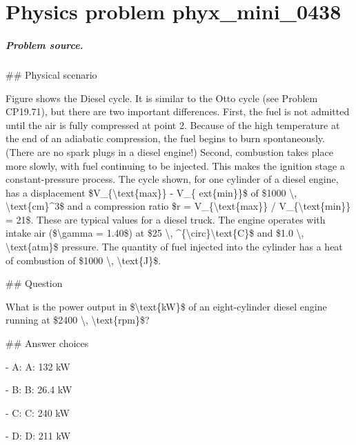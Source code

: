 
\chapter{Physics problem phyx\_mini\_0438}
\label{ch:PhyXMiniProblems_problem_phyx_mini_0438}

\paragraph{Problem source.}
\#\# Physical scenario

Figure shows the Diesel cycle. It is similar to the Otto cycle (see Problem CP19.71), but there are two important differences. First, the fuel is not admitted until the air is fully compressed at point 2. Because of the high temperature at the end of an adiabatic compression, the fuel begins to burn spontaneously. (There are no spark plugs in a diesel engine!) Second, combustion takes place more slowly, with fuel continuing to be injected. This makes the ignition stage a constant-pressure process. The cycle shown, for one cylinder of a diesel engine, has a displacement \$V\_\{\textbackslash{}text\{max\}\} - V\_\{	ext\{min\}\}\$ of \$1000 \textbackslash{}, \textbackslash{}text\{cm\}\textasciicircum{}3\$ and a compression ratio \$r = V\_\{\textbackslash{}text\{max\}\} / V\_\{\textbackslash{}text\{min\}\} = 21\$. These are typical values for a diesel truck. The engine operates with intake air (\$\textbackslash{}gamma = 1.40\$) at \$25 \textbackslash{}, \textasciicircum{}\{\textbackslash{}circ\}\textbackslash{}text\{C\}\$ and \$1.0 \textbackslash{}, \textbackslash{}text\{atm\}\$ pressure. The quantity of fuel injected into the cylinder has a heat of combustion of \$1000 \textbackslash{}, \textbackslash{}text\{J\}\$.

\#\# Question

What is the power output in \$\textbackslash{}text\{kW\}\$ of an eight-cylinder diesel engine running at \$2400 \textbackslash{}, \textbackslash{}text\{rpm\}\$?

\#\# Answer choices

- A: A: 132 kW

- B: B: 26.4 kW

- C: C: 240 kW

- D: D: 211 kW

